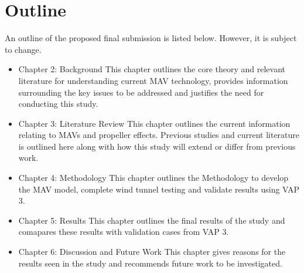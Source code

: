 \section{Outline}
\label{sec:Outline}
An outline of the proposed final submission is listed below. However, it is subject to change.

\begin{itemize}
  \item Chapter 2: Background \newline This chapter outlines the core theory and relevant literature for understanding current MAV technology, provides information surrounding the key issues to be addressed and justifies the need for conducting this study. 
  \item Chapter 3: Literature Review \newline This chapter outlines the current information relating to MAVs and propeller effects. Previous studies and current literature is outlined here along with how this study will extend or differ from previous work.
  \item Chapter 4: Methodology \newline This chapter outlines the Methodology to develop the MAV model, complete wind tunnel testing and validate results using VAP 3.
  \item Chapter 5: Results \newline This chapter outlines the final results of the study and comapares these results with validation cases from VAP 3.
  \item Chapter 6: Discussion and Future Work \newline This chapter gives reasons for the results seen in the study and recommends future work to be investigated. 
\end{itemize}





